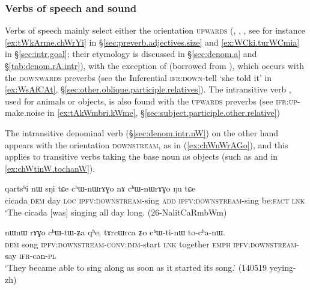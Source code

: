 \subsubsection{Verbs of speech and sound}  \label{sec:preverb.speech}
Verbs of speech mainly select either the orientation \textsc{upwards} (, , , see for instance \ref{ex:tWkArme.chWrYi} in §\ref{sec:preverb.adjectives.size} and \ref{ex:WCki.turWCmia} in §\ref{sec:intr.goal}; their etymology is discussed in §\ref{sec:denom.a} and §\ref{tab:denom.rA.intr}), with the exception of  (borrowed from ), which occurs with the \textsc{downwards} preverbs (see the Inferential  \textsc{ifr}:\textsc{down}-tell `she told it' in \ref{ex:WsAfCAt}, §\ref{sec:other.oblique.participle.relatives}). The intransitive verb , used for animals or objects, is also found with the \textsc{upwards} preverbs (see  \textsc{ifr}:\textsc{up}-make.noise in \ref{ex:tAkWmbri.kWme}, §\ref{sec:subject.participle.other.relative})

The intransitive denominal verb  (§\ref{sec:denom.intr.nW}) on the other hand appears with the orientation \textsc{downstream}, as in (\ref{ex:chWnWrAGo}), and this applies to transitive verbs taking the base noun  as objects (such as  and   in \ref{ex:chWtinW.tochanW}).

\begin{exe}
\ex \label{ex:chWnWrAGo}
\gll qartsʰi nɯ sŋi tɕe cʰɯ-nɯrɤɣo nɤ cʰɯ-nɯrɤɣo ŋu tɕe   \\
cicada \textsc{dem} day \textsc{loc} \textsc{ipfv}:\textsc{downstream}-sing \textsc{add} \textsc{ipfv}:\textsc{downstream}-sing be:\textsc{fact} \textsc{lnk} \\
\glt `The cicada [was] singing all day long. (26-NalitCaRmbWm)
\end{exe} 

\begin{exe}
\ex \label{ex:chWtinW.tochanW}
\gll  nɯnɯ rɤɣo cʰɯ-tɯ-ʑa qʰe, tɤrcɯrca ʑo cʰɯ-ti-nɯ to-cʰa-nɯ. \\
\textsc{dem} song \textsc{ipfv}:\textsc{downstream}-\textsc{conv}:\textsc{imm}-start \textsc{lnk} together \textsc{emph} \textsc{ipfv}:\textsc{downstream}-say \textsc{ifr}-can-\textsc{pl} \\
\glt `They became able to sing along as soon as it started its song.'  (140519 yeying-zh)
\end{exe} 

